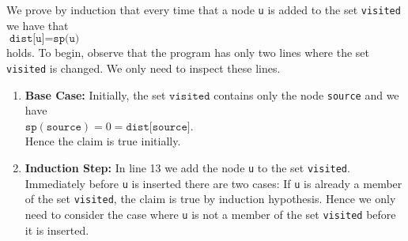 \proof 
We prove by induction that every time that a node \texttt{u} is added to the set
\texttt{visited} we have that
\\[0.2cm]
\hspace*{1.3cm}
$\texttt{dist[u]} = \texttt{sp(u)}$ 
\\[0.2cm]
holds.  To begin, observe that the program has only two lines where the set \texttt{visited} is changed.
We only need to inspect these lines.
\begin{enumerate}
\item \textbf{Base Case:}  
      Initially, the set $\texttt{visited}$ contains only the node \texttt{source} and we have
      \\[0.2cm]
      \hspace*{1.3cm}
      $\texttt{sp}(\texttt{source}) = 0 = \texttt{dist[source]}$.
      \\[0.2cm]
      Hence the claim is true initially.
\item \textbf{Induction Step:}
      In line 13 we add the node \texttt{u} to the set \texttt{visited}.  Immediately before \texttt{u} is
      inserted there are two cases: If \texttt{u} is already a member of the set \texttt{visited}, the
      claim is true by induction hypothesis.  Hence we only need to consider the case where
     \texttt{u} is not a member of the set \texttt{visited} before it is inserted.


\end{enumerate}
